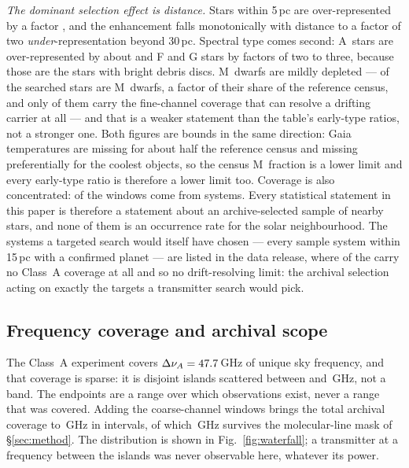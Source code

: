\emph{The dominant selection effect is distance.} Stars within 5\,pc are
over-represented by a factor \SfTopRatio, and the enhancement falls
monotonically with distance to a factor of two \emph{under}-representation
beyond 30\,pc. Spectral type comes second: A~stars are over-represented by
about \SfARatio{} and F and G stars by factors of two to three, because those
are the stars with bright debris discs. M~dwarfs are mildly depleted ---
\SfMSearched{} of the \SfNStar{} searched stars are M~dwarfs, a factor
\SfMRatio{} of their share of the reference census, and only
\SfMClassAStars{} of them carry the fine-channel coverage that can resolve a
drifting carrier at all --- and that is a weaker
statement than the table's early-type ratios, not a stronger one. Both
figures are bounds in the same direction: Gaia temperatures are missing for
about half the reference census and missing preferentially for the coolest
objects, so the census M~fraction is a lower limit and every early-type ratio
is therefore a lower limit too. Coverage is also concentrated:
\ConcThreeWin{} of the \NWindows{} windows come from \ConcThreeSys{}
systems. Every statistical statement in this paper is therefore a statement
about an archive-selected sample of nearby stars, and none of them is an
occurrence rate for the solar neighbourhood. The systems a targeted search
would itself have chosen --- every sample system within 15\,pc with a confirmed
planet --- are listed in the data release, where \CsIntNoClassA{} of the
\CsIntNRow{} carry no Class~A coverage at all and so no drift-resolving limit:
the archival selection acting on exactly the targets a transmitter search
would pick.




\subsection{Frequency coverage and archival scope}
\label{sec:coverage}

The Class~A experiment covers $\Delta\nu_A=47.7$\,GHz of unique sky
frequency, and that coverage is sparse: it is \DomAIslands{} disjoint islands
scattered between \DomAFreqLo{} and \DomAFreqHi\,GHz, not a band. The
endpoints are a range over which observations exist, never a range that was
covered. Adding the coarse-channel windows brings the total archival coverage
to \DnuAB\,GHz in \UnionIntervals{} intervals, of which \SearchedUnionGHz\,GHz
survives the molecular-line mask of \S\ref{sec:method}. The distribution is
shown in Fig.~\ref{fig:waterfall}; a transmitter at a frequency between the
islands was never observable here, whatever its power.

